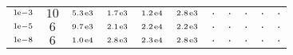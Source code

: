 \begin{tiny}
\begin{tabular}{@{$\;$}c@{$\;$}|@{$\;$}c@{$\;$}@{$\;$}c@{$\;$}@{$\;$}c@{$\;$}@{$\;$}c@{$\;$}@{$\;$}c@{$\;$}|@{$\;$}c@{$\;$}@{$\;$}c@{$\;$}@{$\;$}c@{$\;$}@{$\;$}c@{$\;$}@{$\;$}c@{$\;$}}
$\scriptstyle1\!\mathrm{\hspace{0.10em}e}-3$ & $\scriptstyle10$ & $\scriptstyle5.3\mathrm{\hspace{0.10em}e}3$ & $\scriptstyle1.7\mathrm{\hspace{0.10em}e}3$ & $\scriptstyle1.2\mathrm{\hspace{0.10em}e}4$ & $\scriptstyle2.8\mathrm{\hspace{0.10em}e}3$ & $\scriptstyle.$ & $\scriptstyle.$ & $\scriptstyle.$ & $\scriptstyle.$ & $\scriptstyle.$\\ 
$\scriptstyle1\!\mathrm{\hspace{0.10em}e}-5$ & $\scriptstyle6$ & $\scriptstyle9.7\mathrm{\hspace{0.10em}e}3$ & $\scriptstyle2.1\mathrm{\hspace{0.10em}e}3$ & $\scriptstyle2.2\mathrm{\hspace{0.10em}e}4$ & $\scriptstyle2.2\mathrm{\hspace{0.10em}e}3$ & $\scriptstyle.$ & $\scriptstyle.$ & $\scriptstyle.$ & $\scriptstyle.$ & $\scriptstyle.$\\ 
$\scriptstyle1\!\mathrm{\hspace{0.10em}e}-8$ & $\scriptstyle6$ & $\scriptstyle1.0\mathrm{\hspace{0.10em}e}4$ & $\scriptstyle2.8\mathrm{\hspace{0.10em}e}3$ & $\scriptstyle2.3\mathrm{\hspace{0.10em}e}4$ & $\scriptstyle2.8\mathrm{\hspace{0.10em}e}3$ & $\scriptstyle.$ & $\scriptstyle.$ & $\scriptstyle.$ & $\scriptstyle.$ & $\scriptstyle.$\\ 
\end{tabular} 
\end{tiny} 
